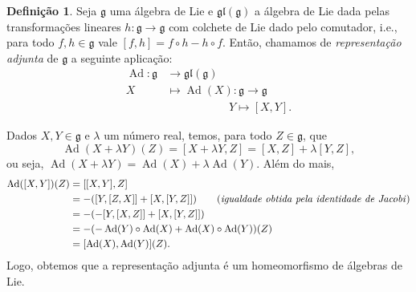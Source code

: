 \documentclass[twoside,openright,titlepage,numbers=noenddot,headinclude,  lineheaders footinclude=true,cleardoublepage=empty,
                                BCOR=5mm,paper=a4,fontsize=12pt ]{scrbook}
\theoremstyle{definition}
\newtheorem{definicao}{Definição}[chapter]
\DeclareMathOperator{\Adj}{Ad}
\begin{document}

\begin{definicao}
Seja $\mathfrak{g}$ uma álgebra de Lie e $\mathfrak{gl(g)}$ a álgebra de Lie dada pelas transformações
lineares $h: \mathfrak{g} \rightarrow \mathfrak{g}$  com colchete de Lie dado pelo comutador, i.e.,
para todo $f,h \in \mathfrak{g}$ vale $[f,h] = f \circ h - h \circ f$. Então, chamamos de	 \textit{representação
adjunta} de $\mathfrak{g}$ a seguinte aplicação: 
\begin{align*}
\Adj: \mathfrak{g} & \rightarrow \mathfrak{gl(g)}                          \\
                X & \mapsto \Adj(X): \mathfrak{g}  \rightarrow \mathfrak{g}\\
                  &                             \qquad \qquad  \quad \; \; Y  \mapsto [X, Y].
\end{align*}
\end{definicao}

Dados $X, Y \in \mathfrak{g}$ e $\lambda$ um 
número real, temos, para todo $Z \in \mathfrak{g}$, que
\[
\Adj(X + \lambda Y)(Z) = [X + \lambda Y, Z] = [X,Z] + \lambda [Y, Z], 
\]
ou seja, $\Adj(X + \lambda Y) = \Adj(X) + \lambda \Adj(Y)$. Além do mais,
\begin{align*}
 \Adj([X,Y])(Z) & = [[X, Y], Z] \\ 
 				& =  -( [Y, [Z, X]] + [X, [Y, Z]] )\qquad (\text{\textit{igualdade obtida pela identidade de Jacobi}}) \\
 				& = -( -[Y, [X, Z]] + [X, [Y, Z]] ) \\
				& = -( - \Adj(Y) \circ \Adj(X) + \Adj(X) \circ \Adj(Y) ) (Z) \\
				& = [\Adj(X), \Adj(Y)](Z).
\end{align*}
Logo, obtemos que a representação adjunta é um homeomorfismo de álgebras de Lie.
\end{document}
